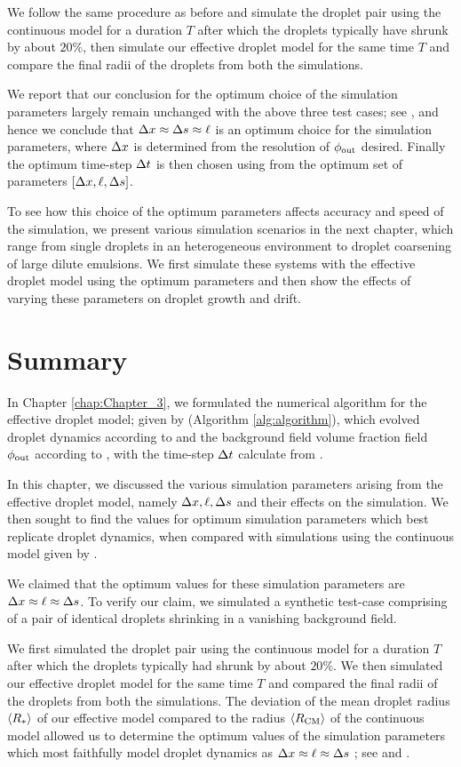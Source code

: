 We follow the same procedure as before and simulate the droplet pair using the continuous model for a duration $T$ after which the droplets typically have shrunk by about $20\%$, then simulate our effective droplet model for the same time $T$ and compare the final radii of the droplets from both the simulations.

We report that our conclusion for the optimum choice of the simulation parameters largely remain unchanged with the above three test cases; see , and hence we conclude that $\Delta x \approx \Delta s \approx \ell$ is an optimum choice for the simulation parameters, where $\Delta x$ is determined from the resolution of $\phi_\mathrm{out}$ desired.
Finally the optimum time-step $\Delta t$ is then chosen using  from the optimum set of parameters $[\Delta x, \ell, \Delta s]$.

To see how this choice of the optimum parameters affects accuracy and speed of the simulation, we present various simulation scenarios in the next chapter, which range from single droplets in an heterogeneous environment to droplet coarsening of large dilute emulsions.
We first simulate these systems with the effective droplet model using the optimum parameters and then show the effects of varying these parameters on droplet growth and drift. 

\section{Summary}

In Chapter \ref{chap:Chapter_3}, we formulated the numerical algorithm for the effective droplet model; given by (Algorithm \ref{alg:algorithm}), which evolved droplet dynamics according to  and the background field volume fraction field $\phi_\mathrm{out}$ according to , with the time-step $\Delta t$ calculate from .

In this chapter, we discussed the various simulation parameters arising from the effective droplet model, namely $\Delta x, \ell, \Delta s$ and their effects on the simulation.
We then sought to find the values for optimum simulation parameters which best replicate droplet dynamics, when compared with simulations using the continuous model given by .

We claimed that the optimum values for these simulation parameters are $\Delta x \approx \ell \approx \Delta s$.
To verify our claim, we simulated a synthetic test-case comprising of a pair of identical droplets shrinking in a vanishing background field. 

We first simulated the droplet pair using the continuous model for a duration $T$ after which the droplets typically had shrunk by about $20\%$.
We then simulated our effective droplet model for the same time $T$ and compared the final radii of the droplets from both the simulations.
The deviation of the mean droplet radius $\langle R_*\rangle$ of our effective model compared to the radius $\langle R_\mathrm{CM}\rangle$ of the continuous model allowed us to determine the optimum values of the simulation parameters which most faithfully model droplet dynamics as $\Delta x \approx \ell \approx \Delta s$ ; see  and .